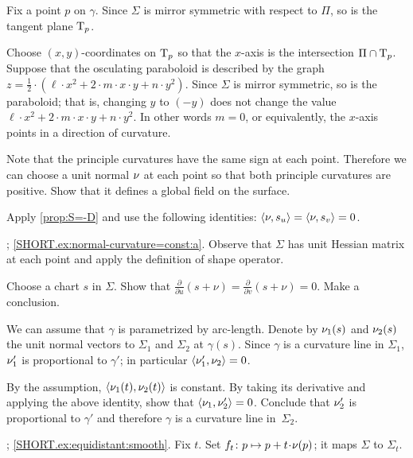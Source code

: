 \setcounter{eqtn}{0}

Fix a point $p$ on $\gamma$.
Since $\Sigma$ is mirror symmetric with respect to $\Pi$,
so is the tangent plane $\mathrm{T}_p$.

Choose $(x,y)$-coordinates on $\mathrm{T}_p$ so that the $x$-axis is the intersection $\Pi\cap  \mathrm{T}_p$.
Suppose that the osculating paraboloid is described by the graph 
$z=\tfrac12\cdot(\ell\cdot x^2+2\cdot m\cdot x\cdot y+n\cdot y^2)$.
Since $\Sigma$ is mirror symmetric, so is the paraboloid;
that is, changing $y$ to $(-y)$ does not change the value 
$\ell\cdot x^2+2\cdot m\cdot x\cdot y+n\cdot y^2$.
In other words $m=0$, or equivalently, the $x$-axis points in a direction of curvature.

 Note that the principle curvatures have the same sign at each point.
Therefore we can choose a unit normal $\nu$ at each point so that both principle curvatures are positive.
Show that it defines a global field on the surface.

Apply \ref{prop:S=-D} and use the following identities:
$\langle\nu,s_u\rangle=\langle\nu,s_v\rangle=0$.

\parbf{\ref{ex:normal-curvature=const}}; \ref{SHORT.ex:normal-curvature=const:a}.
Observe that $\Sigma$ has unit Hessian matrix at each point and apply the definition of shape operator.

Choose a chart $s$ in $\Sigma$.
Show that
$\tfrac{\partial }{\partial u}(s+\nu)
=
\tfrac{\partial }{\partial v}(s+\nu)
=
0$.
Make a conclusion.

We can assume that $\gamma$ is parametrized by  arc-length.
Denote by $\nu_1(s)$ and $\nu_2(s)$ the unit normal vectors to $\Sigma_1$ and $\Sigma_2$ at $\gamma(s)$.
Since $\gamma$ is a curvature line in $\Sigma_1$,  
$\nu_1'$ is proportional to $\gamma'$;
in particular $\langle\nu_1',\nu_2\rangle=0$.

By the assumption, $\langle \nu_1(t),\nu_2(t)\rangle$ is constant.
By taking its derivative and applying the above identity, show that $\langle\nu_1,\nu_2'\rangle=0$.
Conclude that $\nu_2'$ is proportional to $\gamma'$
and therefore $\gamma$ is a curvature line in~$\Sigma_2$.

\parbf{\ref{ex:equidistant}};
\ref{SHORT.ex:equidistant:smooth}.
Fix $t$.
Set $f_t\:p\mapsto p+t\cdot\Norm(p)$; it maps $\Sigma$ to $\Sigma_t$.

